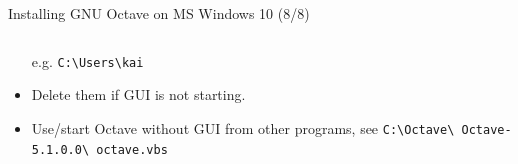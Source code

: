\begin{frame}{Installing GNU Octave on MS Windows 10 (8/8)}
\begin{columns}
\begin{column}{0.6\textwidth}
\begin{itemize}
e.g. \texttt{C:\textbackslash Users\textbackslash kai}

\item
Delete them if GUI is not starting.

\item
Use/start Octave without GUI from other programs, see
\texttt{\small C:\textbackslash Octave\textbackslash
Octave-5.1.0.0\textbackslash
octave.vbs}
\end{itemize}
\end{column}
\end{columns}
\end{frame}